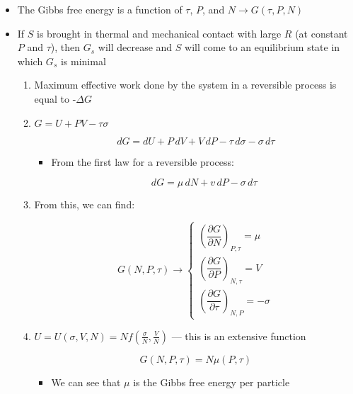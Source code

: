\begin{itemize}

  \item The Gibbs free energy is a function of $\tau$, $P$, and $N\to G(\tau,P,N)$

  \item If $S$ is brought in thermal and mechanical contact with large $R$ (at constant $P$ and $\tau$), then $G_s$ will decrease and $S$ will come to an equilibrium state in which $G_s$ is minimal

    \begin{enumerate}

      \item Maximum effective work done by the system in a reversible process is equal to -$\Delta G$

      \item $G=U+PV-\tau\sigma$

        $$dG=dU+P\,dV+V\,dP-\tau\,d\sigma-\sigma\,d\tau$$

        \begin{itemize}

          \item From the first law for a reversible process:

            $$dG=\mu\,dN+v\,dP-\sigma\,d\tau$$

        \end{itemize}

      \item From this, we can find:

        $$G(N,P,\tau)\to\left\{\begin{array}{l} \left( \dfrac{\partial G}{\partial N} \right)_{P,\tau}=\mu\\\left( \dfrac{\partial G}{\partial P} \right)_{N,\tau}=V\\ \left( \dfrac{\partial G}{\partial \tau}\right)_{N,P}=-\sigma\end{array}$$

        \item $U=U(\sigma,V,N)=Nf\left( \frac{\sigma}{N},\frac{V}{N} \right)$ — this is an extensive function

          $$G(N,P,\tau)=N\mu(P,\tau)$$

          \begin{itemize}

            \item We can see that $\mu$ is the Gibbs free energy per particle

          \end{itemize}


\end{enumerate}
\end{itemize}
